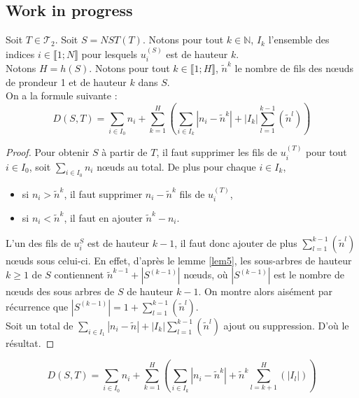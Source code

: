 \subsection{Work in progress}
\begin{lem}
  \label{lem7}
  Soit $T \in \mathcal{T}_{2}$. Soit $S = NST(T)$. Notons pour tout
  $k \in \mathbb{N}$, $I_{k}$ l'ensemble des indices
  $i \in \llbracket 1;N \rrbracket$ pour lesquels $u_{i}^{(S)}$ est de
  hauteur $k$. \\
  Notons $H = h(S)$. Notons pour tout
  $k \in \llbracket 1;H \rrbracket$, $\tilde{n}^{k}$ le
  nombre de fils des nœuds de prondeur 1 et de hauteur $k$ dans $S$.\\
  On a la formule suivante :
  $$ D(S,T) = \sum_{i \in I_{0}} n_{i} + \sum_{k = 1}^{H} \left(
    \sum_{i \in I_{k}} |n_{i} - \tilde{n}^{k}| + |I_{k}|\sum_{l =
      1}^{k-1}(\tilde{n}^{l}) \right)$$
  \begin{proof}
    Pour obtenir $S$ à partir de $T$, il faut supprimer les fils de
    $u_{i}^{(T)}$ pour tout $i \in I_{0}$, soit $\sum_{i \in I_{0}} n_{i}$
    nœuds au total. De plus pour chaque $i \in I_{k}$,
    \begin{itemize}
    \item si $n_{i} > \tilde{n}^{k}$, il faut supprimer
      $n_{i} - \tilde{n}^{k}$ fils de $u_{i}^{(T)}$,
    \item si $n_{i} < \tilde{n}^{k}$, il faut en ajouter
      $\tilde{n}^{k} - n_{i}$. 
    \end{itemize}
    L'un des fils de $u_{i}^{S}$ est de hauteur $k-1$, il faut donc
    ajouter de plus $\sum_{l = 1}^{k-1}(\tilde{n}^{l})$ nœuds sous
    celui-ci. En effet, d'après le lemme \ref{lem5}, les sous-arbres
    de hauteur $k \geqslant 1$ de $S$ contiennent
    $\tilde{n}^{k-1} + \left| S^{(k-1)} \right|$ nœuds, où
    $ \left| S^{(k-1)} \right|$ est le nombre de nœuds des sous arbres
    de $S$
    de hauteur $k-1$. On montre alors aisément par récurrence que
    $\left| S^{(k-1)} \right| = 1 + \sum_{l =
      1}^{k-1}(\tilde{n}^{l})$.\\
    Soit un total de
    $\sum_{i \in I_{1}} |n_{i} - \tilde{n}| + |I_{k}|\sum_{l =
      1}^{k-1}(\tilde{n}^{l})$ ajout ou suppression. D'où le résultat.
 
  \end{proof}
\end{lem}

\begin{rem}
  \label{rem3}
   $$ D(S,T) = \sum_{i \in I_{0}} n_{i} + \sum_{k = 1}^{H} \left(
    \sum_{i \in I_{k}} |n_{i} - \tilde{n}^{k}| + \tilde{n}^{k}\sum_{l =
      k+1}^{H}(|I_{l}|) \right)$$
\end{rem}

